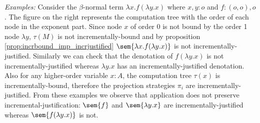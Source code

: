 
\noindent \emph{Examples:} Consider the $\beta$-normal term $\lambda
x . f (\lambda y .x)$ where $x,y:o$ and $f:(o,o),o$. The figure on
the right represents the computation tree with the order of each
node in the exponent part. Since node $x$ of order $0$ is not bound
by the order 1 node $\lambda y$, $\tau(M)$ is not
incrementally-bound and by proposition
\ref{prop:incrbound_imp_incrjustified} $\sem{\lambda x . f (\lambda
y .x)}$ is not incrementally-justified. Similarly we can check that
the denotation of $f (\lambda y .x)$ is not incrementally-justified
whereas $\lambda y. x$ has an incrementally-justified denotation.
Also for any higher-order variable $x:A$, the computation tree
$\tau(x)$ is incrementally-bound, therefore the projection
strategies $\pi_i$ are incrementally-justified. From these examples
we observe that application does not preserve
incremental-justification: $\sem{f}$ and $\sem{\lambda y. x}$ are
incrementally-justified whereas $\sem{f (\lambda y .x)}$ is not.



